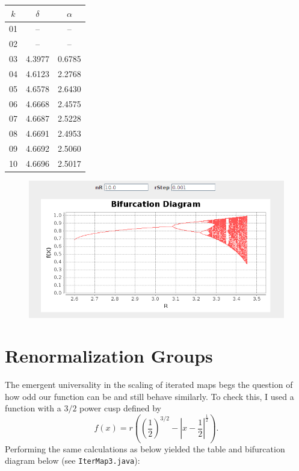 \documentclass[aps,letterpaper,10pt]{article}
\newcommand{\ttt}{\texttt}
\begin{document}
\begin{center}
\begin{tabular}{|c|c|c|}
\hline
$k$&$\delta$&$\alpha$\\
\hline
01&--&--\\
02&--&--\\
03&4.3977&0.6785\\
04&4.6123&2.2768\\
05&4.6578&2.6430\\
06&4.6668&2.4575\\
07&4.6687&2.5228\\
08&4.6691&2.4953\\
09&4.6692&2.5060\\
10&4.6696&2.5017\\
\hline
\end{tabular}
\begin{figure}[!h]
\centering
\includegraphics[width=.5\textwidth]{IterMap2.png}
\end{figure}
\end{center}


\section{Renormalization Groups}

The emergent universality in the scaling of iterated maps begs the question of how odd our function can be and still behave similarly. To check this, I used a function with a $3/2$ power cusp defined by $$f(x) = r\left( (\frac{1}{2})^{3/2} - |x-\frac{1}{2}|^\frac{1}{2}  \right).$$ Performing the same calculations as below yielded the table and bifurcation diagram below (see \ttt{IterMap3.java}):
\end{document}
